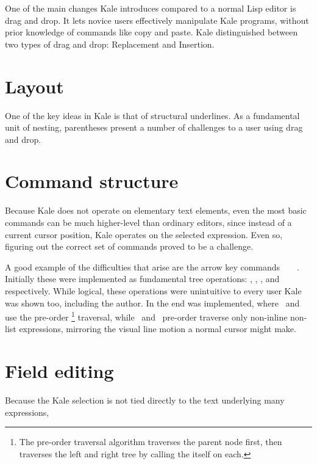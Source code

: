 One of the main changes Kale introduces compared to a normal Lisp editor is
drag and drop. It lets novice users effectively manipulate Kale programs,
without prior knowledge of commands like copy and paste. Kale distinguished
between two types of drag and drop: Replacement and Insertion. 

\section{Layout}

One of the key ideas in Kale is that of structural underlines. As a
fundamental unit of nesting, parentheses present a number of challenges to a
user using drag and drop.

\section{Command structure}

Because Kale does not operate on elementary text elements, even the most
basic
commands can be much higher-level than ordinary editors, since instead of a
current cursor position, Kale operates on the selected expression. Even so,
figuring out the correct set of commands proved to be a challenge.

A good example of the difficulties that arise are the arrow key
commands~\ak{^}~~\ak{<}~\ak{>}. Initially these were implemented as
fundamental tree operations: , ,
, and  respectively.
While logical, these operations were unintuitive to every user
Kale was shown too, including the author. In the end  was
implemented, where~\ak{<} and~\ak{>} use the pre-order%
%
\footnote{The pre-order traversal algorithm traverses the parent node first,
then traverses the left and right tree by calling the itself on each.}
%
traversal, while~\ak{^} and~
pre-order traverse only non-inline non-list expressions, mirroring the visual
line motion a normal cursor might make.

\section{Field editing}
Because the Kale selection is not tied directly to the text underlying many
expressions, 


